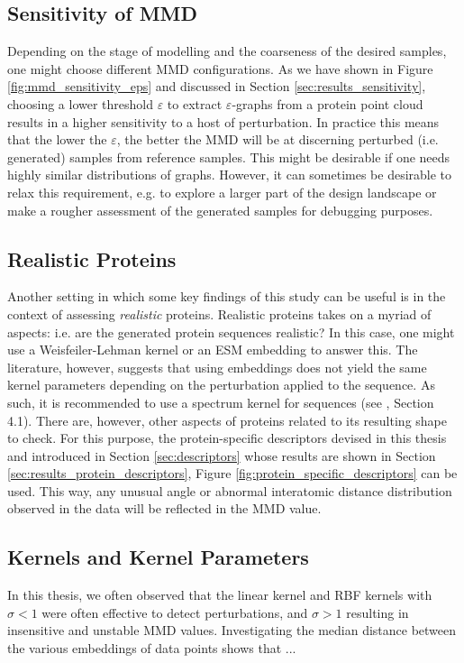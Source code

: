 \subsection{Sensitivity of MMD}\label{sec:discussion_right_mmd}
Depending on the stage of modelling and the coarseness of the desired samples,
one might choose different MMD configurations. As we have shown in Figure
\ref{fig:mmd_sensitivity_eps} and discussed in Section
\ref{sec:results_sensitivity}, choosing a lower threshold $\varepsilon$ to
extract $\varepsilon$-graphs from a protein point cloud results in a higher
sensitivity to a host of perturbation. In practice this means that the lower the
$\varepsilon$, the better the MMD will be at discerning perturbed (i.e.
generated) samples from reference samples. This might be desirable if one needs
highly similar distributions of graphs. However, it can sometimes be desirable
to relax this requirement, e.g. to explore a larger part of the design landscape
or make a rougher assessment of the generated samples for debugging purposes.

\subsection{Realistic Proteins}

Another setting in which some key findings of this study can be useful is in the
context of assessing \emph{realistic} proteins. Realistic proteins takes on a
myriad of aspects: i.e. are the generated protein sequences realistic? In this
case, one might use a Weisfeiler-Lehman kernel or an ESM embedding to answer
this. The literature, however, suggests that using embeddings does not yield the
same kernel parameters depending on the perturbation applied to the sequence. As
such, it is recommended to use a spectrum kernel \citep{leslie2001spectrum} for
sequences (see \cite{kucera2021conditional}, Section 4.1). There are, however,
other aspects of proteins related to its resulting shape to check. For this
purpose, the protein-specific descriptors devised in this thesis and introduced in
Section \ref{sec:descriptors} whose results are shown in Section
\ref{sec:results_protein_descriptors}, Figure
\ref{fig:protein_specific_descriptors} can be used. This way, any unusual angle
or abnormal interatomic distance distribution observed in the data will be
reflected in the MMD value.

\subsection{Kernels and Kernel Parameters}
In this thesis, we often observed that the linear kernel and RBF kernels with
$\sigma<1$ were often effective to detect perturbations, and $\sigma>1$
resulting in insensitive and unstable MMD values. Investigating the median
distance between the various embeddings of data points shows that ...

